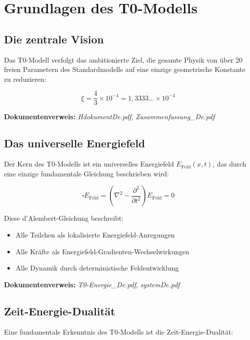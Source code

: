 \documentclass[12pt,a4paper]{article}
\newcommand{\xipar}{\xi}
\newcommand{\Efield}{E_{\text{Feld}}}
\begin{document}
	\section{Grundlagen des T0-Modells}
	
	\subsection{Die zentrale Vision}
	
	Das T0-Modell verfolgt das ambitionierte Ziel, die gesamte Physik von über 20 freien Parametern des Standardmodells auf eine einzige geometrische Konstante zu reduzieren:
	
	\begin{equation}
		\xipar = \frac{4}{3} \times 10^{-4} = 1,3333\ldots \times 10^{-4}
	\end{equation}
	
	\textbf{Dokumentenverweis:} \textit{HdokumentDe.pdf}, \textit{Zusammenfassung\_De.pdf}
	
	\subsection{Das universelle Energiefeld}
	
	Der Kern des T0-Modells ist ein universelles Energiefeld $\Efield(x,t)$, das durch eine einzige fundamentale Gleichung beschrieben wird:
	
	\begin{equation}
		\square \Efield = \left(\nabla^2 - \frac{\partial^2}{\partial t^2}\right) \Efield = 0
	\end{equation}
	
	Diese d'Alembert-Gleichung beschreibt:
	\begin{itemize}
		\item Alle Teilchen als lokalisierte Energiefeld-Anregungen
		\item Alle Kräfte als Energiefeld-Gradienten-Wechselwirkungen
		\item Alle Dynamik durch deterministische Feldentwicklung
	\end{itemize}
	
	\textbf{Dokumentenverweis:} \textit{T0-Energie\_De.pdf}, \textit{systemDe.pdf}
	
	\subsection{Zeit-Energie-Dualität}
	
	Eine fundamentale Erkenntnis des T0-Modells ist die Zeit-Energie-Dualität:
	
\end{document}
